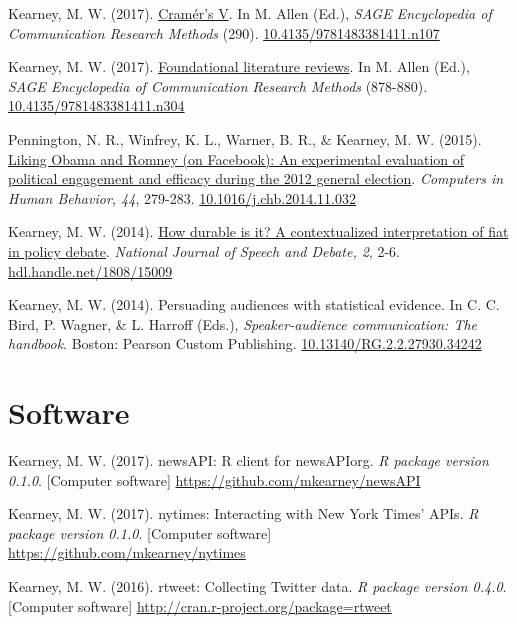 \documentclass[11pt,letterpaper]{article}
\begin{document}
\begin{bibenum}
    \item[] Kearney, M. W. (2017).
    \href{http://mikewk.com/cramersv.pdf}{Cram\'{e}r's V}.
    In M. Allen (Ed.), \textit{SAGE Encyclopedia of Communication Research Methods} (290).
    \href{http://dx.doi.org/10.4135/9781483381411.n107}{10.4135/9781483381411.n107}

    \item[] Kearney, M. W. (2017).
    \href{http://mikewk.com/flr.pdf}{Foundational literature reviews}.
    In M. Allen (Ed.), \textit{SAGE Encyclopedia of Communication Research Methods} (878-880).
    \href{http://dx.doi.org/10.4135/9781483381411.n304}{10.4135/9781483381411.n304}

    \item Pennington, N. R., Winfrey, K. L., Warner, B. R., \& Kearney, M. W. (2015).
    \href{http://www.researchgate.net/publication/269728178_Liking_Obama_and_Romney_(on_Facebook)_An_experimental_evaluation_of_political_engagement_and_efficacy_during_the_2012_general_election}{
    Liking Obama and Romney (on Facebook): An experimental evaluation of political engagement and efficacy during the 2012 general election}.
    \textit{Computers in Human Behavior, 44}, 279-283.
    \href{https://doi.org/10.1016/j.chb.2014.11.032}{10.1016/j.chb.2014.11.032}

    \item Kearney, M. W. (2014). \href{http://ssrn.com/abstract=2618298}{
    How durable is it? A contextualized interpretation of fiat in policy debate}.
    \textit{National Journal of Speech and Debate, 2}, 2-6.
    \href{http://hdl.handle.net/1808/15009}{hdl.handle.net/1808/15009}

    \item[] Kearney, M. W. (2014). Persuading audiences with statistical evidence.
    In C. C. Bird, P. Wagner, \& L. Harroff (Eds.), \textit{Speaker-audience communication: The handbook}.
    Boston: Pearson Custom Publishing.
    \href{https://dx.doi.org/10.13140/RG.2.2.27930.34242}{10.13140/RG.2.2.27930.34242}
  \end{bibenum}

\section{Software}
  \begin{bibenum}
    \item Kearney, M. W. (2017). newsAPI: R client for newsAPIorg.
    \textit{R package version 0.1.0}. [Computer software]
    \href{https://github.com/mkearney/newsAPI}{https://github.com/mkearney/newsAPI}

    \item Kearney, M. W. (2017). nytimes: Interacting with New York Times' APIs.
    \textit{R package version 0.1.0}. [Computer software]
    \href{https://github.com/mkearney/nytimes}{https://github.com/mkearney/nytimes}

    \item Kearney, M. W. (2016). rtweet: Collecting Twitter data.
    \textit{R package version 0.4.0}. [Computer software]
    \href{http://cran.r-project.org/package=rtweet}{http://cran.r-project.org/package=rtweet}
  \end{bibenum}
\end{document}
